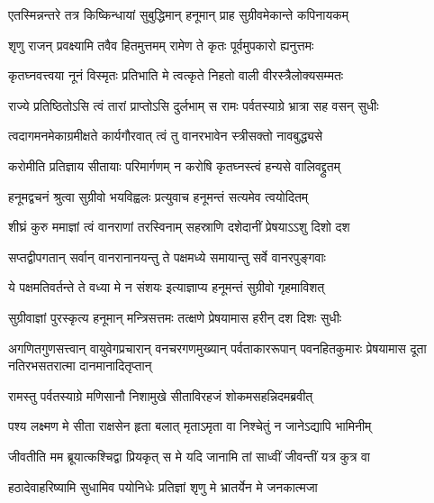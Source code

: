 \twolineshloka
{एतस्मिन्नन्तरे तत्र किष्किन्धायां सुबुद्धिमान्}
{हनूमान् प्राह सुग्रीवमेकान्ते कपिनायकम्} %

\twolineshloka
{शृणु राजन् प्रवक्ष्यामि तवैव हितमुत्तमम्}
{रामेण ते कृतः पूर्वमुपकारो ह्यनुत्तमः} %

\twolineshloka
{कृतघ्नवत्त्वया नूनं विस्मृतः प्रतिभाति मे}
{त्वत्कृते निहतो वाली वीरस्त्रैलोक्यसम्मतः} %

\twolineshloka
{राज्ये प्रतिष्ठितोऽसि त्वं तारां प्राप्तोऽसि दुर्लभाम्}
{स रामः पर्वतस्याग्रे भ्रात्रा सह वसन् सुधीः} %

\twolineshloka
{त्वदागमनमेकाग्रमीक्षते कार्यगौरवात्}
{त्वं तु वानरभावेन स्त्रीसक्तो नावबुद्ध्यसे} %

\twolineshloka
{करोमीति प्रतिज्ञाय सीतायाः परिमार्गणम्}
{न करोषि कृतघ्नस्त्वं हन्यसे वालिवद्द्रुतम्} %

\twolineshloka
{हनूमद्वचनं श्रुत्वा सुग्रीवो भयविह्वलः}
{प्रत्युवाच हनूमन्तं सत्यमेव त्वयोदितम्} %

\twolineshloka
{शीघ्रं कुरु ममाज्ञां त्वं वानराणां तरस्विनाम्}
{सहस्राणि दशेदानीं प्रेषयाऽऽशु दिशो दश} %

\twolineshloka
{सप्तद्वीपगतान् सर्वान् वानरानानयन्तु ते}
{पक्षमध्ये समायान्तु सर्वे वानरपुङ्गवाः} %

\twolineshloka
{ये पक्षमतिवर्तन्ते ते वध्या मे न संशयः}
{इत्याज्ञाप्य हनूमन्तं सुग्रीवो गृहमाविशत्} %

\twolineshloka
{सुग्रीवाज्ञां पुरस्कृत्य हनूमान् मन्त्रिसत्तमः}
{तत्क्षणे प्रेषयामास हरीन् दश दिशः सुधीः} %

\fourlineindentedshloka
{अगणितगुणसत्त्वान् वायुवेगप्रचारान्}
{वनचरगणमुख्यान् पर्वताकाररूपान्}
{पवनहितकुमारः प्रेषयामास दूता\-}
{नतिरभसतरात्मा दानमानादितृप्तान्} %





\twolineshloka
{रामस्तु पर्वतस्याग्रे मणिसानौ निशामुखे}
{सीताविरहजं शोकमसहन्निदमब्रवीत्} %

\twolineshloka
{पश्य लक्ष्मण मे सीता राक्षसेन हृता बलात्}
{मृताऽमृता वा निश्चेतुं न जानेऽद्यापि भामिनीम्} %

\twolineshloka
{जीवतीति मम ब्रूयात्कश्चिद्वा प्रियकृत् स मे}
{यदि जानामि तां साध्वीं जीवन्तीं यत्र कुत्र वा} %

\twolineshloka
{हठादेवाहरिष्यामि सुधामिव पयोनिधेः}
{प्रतिज्ञां शृणु मे भ्रातर्येन मे जनकात्मजा} %

